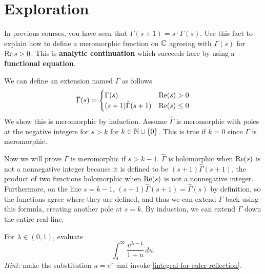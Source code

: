 \documentclass{homework}
\begin{document}
                        \section{Exploration}

                        \begin{problem}
                          In previous courses, you have seen that
                            $\Gamma(s+1) = s \cdot \Gamma(s)$.  Use this fact to explain how to
                              define a meromorphic function on $\mathbb{C}$ agreeing with $\Gamma(s)$ for
                                $\operatorname{Re} s > 0$.  This is \textbf{analytic continuation} which succeeds
                                  here by using a \textbf{functional equation}.
                                  \end{problem}
                                  \begin{solution}
                                  We can define an extension named $\hat\Gamma$ as follows
                                  \[
                                  \hat\Gamma(s) = \begin{cases}
                                  \Gamma(s) &\operatorname{Re}(s) > 0\\
                                  (s+1)\hat \Gamma(s+1) &\operatorname{Re}(s) \leq 0\\
                                  \end{cases}
                                  \]
                                  We show this is meromorphic by induction. Assume $\hat\Gamma$ is meromorphic with poles at the negative integers for $s>k$ for $k\in \mathbb{N}\cup \{0\}$. This is true if $k=0$ since $\Gamma$ is meromorphic. 

                                  Now we will prove $\hat\Gamma$ is meromorphic if $s>k-1$. $\hat\Gamma$ is holomorphic when $\operatorname{Re}(s)$ is not a nonnegative integer because it is defined to be $(s+1)\hat\Gamma(s+1)$, the product of two functions holomorphic when $\operatorname{Re}(s)$ is not a nonnegative integer. Furthermore, on the line $s=k-1$, $(s+1)\hat\Gamma(s+1)= \hat\Gamma(s)$ by definition, so the functions agree where they are defined, and thus we can extend $\Gamma$ back using this formula, creating another pole at $s=k$. By induction, we can extend $\Gamma$ down the entire real line.

                                  \end{solution}
                                  \begin{problem}\label{start-of-reflection-formula}For $\lambda \in (0,1)$, evaluate
                                    \[
                                        \int_{0}^\infty \frac{u^{\lambda - 1}}{1 + u} \, du.
                                          \]
                                            \textit{Hint:} make the substitution $u = e^x$ and invoke \ref{integral-for-euler-reflection}.
                                            \end{problem}
\end{document}

